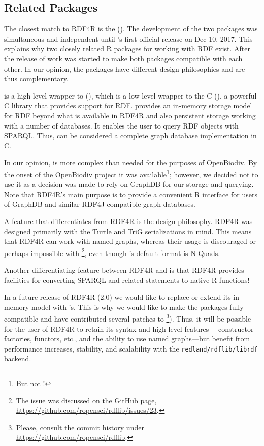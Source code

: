 \subsection{Related Packages}

The closest match to RDF4R is the  (\cite{boettiger_rdflib:_2018}). The development of the two packages was simultaneous and independent until 's first official release on Dec 10, 2017. This explains why two closely related R packages for working with RDF exist. After the release of  work was started  to make both packages compatible with each other. In our opinion, the packages have different design philosophies and are thus complementary.

 is a high-level wrapper to  (\cite{jones_redland:_2016}), which is a low-level wrapper to the C  (\cite{beckett_redland_2014}), a powerful C library that provides support for RDF.  provides an in-memory storage model for RDF beyond what is available in RDF4R and also persistent storage working with a number of databases. It enables the user to query RDF objects with SPARQL. Thus,  can be considered a complete graph database implementation in C.

In our opinion,  is more complex than needed for the purposes of OpenBiodiv. By the onset of the OpenBiodiv project it was available\footnote{But not !}; however, we decided not to use it as a decision was made to rely on GraphDB for our storage and querying. Note that RDF4R's main purpose is to provide a convenient R interface for users of GraphDB and similar RDF4J compatible graph databases.

A feature that differentiates  from RDF4R is the design philosophy. RDF4R was designed primarily with the Turtle and TriG serializations in mind. This means that RDF4R can work with named graphs, whereas their usage is discouraged or perhaps impossible with \footnote{The issue was discussed on the  GitHub page, \url{https://github.com/ropensci/rdflib/issues/23}.}, even though 's default format is N-Quads.

Another differentiating feature between RDF4R and  is that RDF4R provides facilities for converting SPARQL and related statements to native R functions!

In a future release of RDF4R (2.0) we would like to replace or extend its in-memory model with 's. This is why we would like to make the packages fully compatible and have contributed several patches to \footnote{Please, consult the commit history under \url{https://github.com/ropensci/rdflib}.}). Thus, it will be possible for the user of RDF4R to retain its syntax and high-level features--- constructor factories, functors, etc., and the ability to use named graphs---but benefit from performance increases, stability, and scalability with the {\tt redland/rdflib/librdf} backend.

